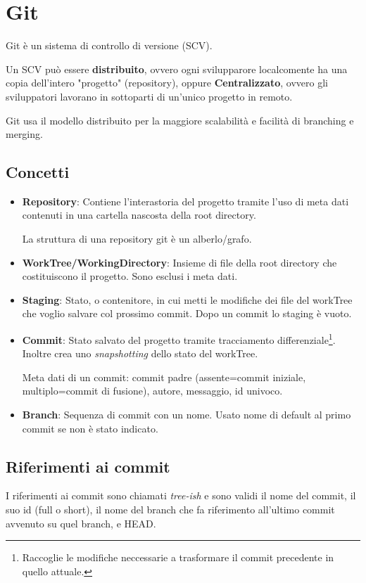 \section{Git}
Git è un sistema di controllo di versione (SCV).

Un SCV può essere \textbf{distribuito}, ovvero ogni svilupparore localcomente ha una copia dell'intero "progetto" (repository), oppure \textbf{Centralizzato}, ovvero gli sviluppatori lavorano in sottoparti di un'unico progetto in remoto.

Git usa il modello distribuito per la maggiore scalabilità e facilità di branching e merging.

\subsection{Concetti}
\begin{itemize}
	\item \textbf{Repository}: Contiene l'interastoria del progetto tramite l'uso di meta dati contenuti in una cartella nascosta della root directory.

	La struttura di una repository git è un alberlo/grafo.

	\item \textbf{WorkTree/WorkingDirectory}: Insieme di file della root directory che costituiscono il progetto. Sono esclusi i meta dati.

	\item \textbf{Staging}: Stato, o contenitore, in cui metti le modifiche dei file del workTree che voglio salvare col prossimo commit. Dopo un commit lo staging è vuoto.

	\item \textbf{Commit}: Stato salvato del progetto tramite tracciamento differenziale\footnote{Raccoglie le modifiche neccessarie a trasformare il commit precedente in quello attuale.}. Inoltre crea uno \textit{snapshotting} dello stato del workTree.

	Meta dati di un commit: commit padre (assente=commit iniziale, multiplo=commit di fusione), autore, messaggio, id univoco.

	\item \textbf{Branch}: Sequenza di commit con un nome. Usato nome di default al primo commit se non è stato indicato.
\end{itemize}

\subsection{Riferimenti ai commit}
I riferimenti ai commit sono chiamati \textit{tree-ish} e sono validi il nome del commit, il suo id (full o short), il nome del branch che fa riferimento all'ultimo commit avvenuto su quel branch, e HEAD.

